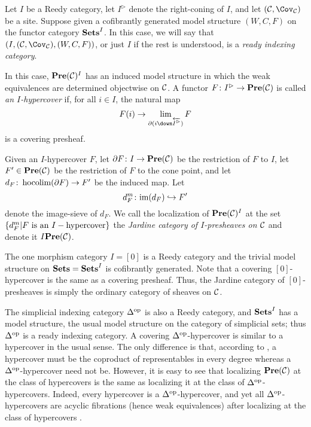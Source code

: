 \documentclass[10pt]{amsart}
\begin{document}
\begin{definition}

Let $I$ be a Reedy category, let $I^\rhd$ denote the right-coning of $I$, and let $(\mcC,\Cov_\mcC)$ be a site.  Suppose given a cofibrantly generated model structure $(W,C,F)$ on the functor category ${\bf Sets}^I$.  In this case, we will say that $(I,(\mcC,\Cov_\mcC),(W,C,F))$, or just $I$ if the rest is understood, is a {\em ready indexing category}.

In this case, ${\bf Pre}(\mathcal{C})^I$ has an induced model structure in which the weak equivalences are determined objectwise on $\mathcal{C}$.  A functor $F\colon I^\rhd\rightarrow{\bf Pre}(\mathcal{C})$ is called {\em an $I$-hypercover} if,
for all $i\in I$, the natural map $$F(i)\to\lim_{\partial(i\down \overleftarrow{I^\rhd})} F$$ is a covering presheaf.  

Given an $I$-hypercover $F$, let $\partial F\colon I\rightarrow{\bf Pre}(\mathcal{C})$ be the restriction of $F$ to $I$, let $F'\in{\bf Pre}(\mathcal{C})$ be the restriction of $F$ to the cone point, and let $d_F\colon\mathop{\textnormal{hocolim}}(\partial F)\rightarrow F'$ be the induced map.  Let $$d_F^m\colon\textnormal{im}(d_F)\hookrightarrow F'$$ denote the image-sieve of $d_F$.  We
call the localization of ${\bf Pre}(\mathcal{C})^I$ at the set $\{d_F^m|F \textnormal{ is an } I-\textnormal{hypercover}\}$ the {\em Jardine category of $I$-presheaves on $\mathcal{C}$} and denote it
$I{\bf Pre}(\mathcal{C})$.

\end{definition}

\begin{example}

The one morphism category $I=[0]$ is a Reedy category and the trivial model structure on ${\bf Sets}={\bf Sets}^I$ is cofibrantly generated.  Note that a covering $[0]$-hypercover is the same as a covering
presheaf.  Thus, the Jardine category of $[0]$-presheaves is simply the ordinary category of sheaves on $\mathcal{C}$. 

The simplicial indexing category $\Delta^\textnormal{op}$ is also a Reedy category, and ${\bf Sets}^I$ has a model structure, the usual model structure on the category of simplicial sets; thus $\Delta^\textnormal{op}$ is a ready indexing category.  A covering
$\Delta^\textnormal{op}$-hypercover is similar to a hypercover in the usual sense.  The only difference is that, according to \cite{DHI}, a
hypercover must be the coproduct of representables in every degree whereas a $\Delta^\textnormal{op}$-hypercover need not be.  However, it is easy to see that localizing ${\bf Pre}(\mathcal{C})$ at
the class of hypercovers is the same as localizing it at the class of $\Delta^\textnormal{op}$-hypercovers.  Indeed, every hypercover is a $\Delta^\textnormal{op}$-hypercover, and yet all  $\Delta^\textnormal{op}$-hypercovers are acyclic fibrations (hence weak equivalences) after localizing at the class of hypercovers .

\end{example}
\end{document}
